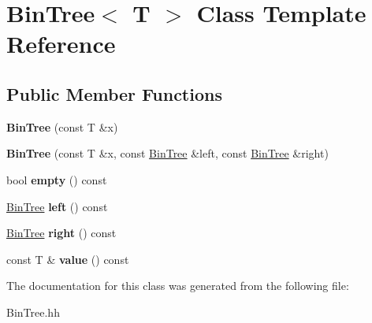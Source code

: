 \hypertarget{classBinTree}{}\section{Bin\+Tree$<$ T $>$ Class Template Reference}
\label{classBinTree}
\subsection*{Public Member Functions}
\begin{DoxyCompactItemize}
\item 
\mbox{\label{classBinTree_a1ab686e0bcf990093ff91fe71744c1a4}} 
{\bfseries Bin\+Tree} (const T \&x)
\item 
\mbox{\label{classBinTree_adb7eeff76d08130c943b36af215eb521}} 
{\bfseries Bin\+Tree} (const T \&x, const \hyperlink{classBinTree}{Bin\+Tree} \&left, const \hyperlink{classBinTree}{Bin\+Tree} \&right)
\item 
\mbox{\label{classBinTree_a74cda259ba5c25b8ee38ed4dc33e4fad}} 
bool {\bfseries empty} () const
\item 
\mbox{\label{classBinTree_a82108db4c1b08d1f111027788c196d4e}} 
\hyperlink{classBinTree}{Bin\+Tree} {\bfseries left} () const
\item 
\mbox{\label{classBinTree_aff8e96651b27284c329667b5ad3e4d0b}} 
\hyperlink{classBinTree}{Bin\+Tree} {\bfseries right} () const
\item 
\mbox{\label{classBinTree_a734e785b089c87b49187ee7c58edf5f3}} 
const T \& {\bfseries value} () const
\end{DoxyCompactItemize}


The documentation for this class was generated from the following file\+:\begin{DoxyCompactItemize}
\item 
Bin\+Tree.\+hh\end{DoxyCompactItemize}
